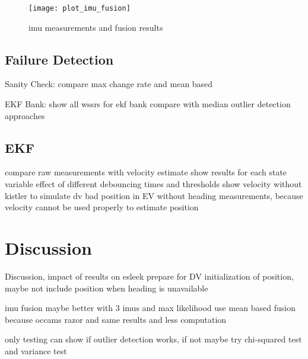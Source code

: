 \begin{figure}[t]
	\centering
	\texttt{[image: plot\_imu\_fusion]}%
	\caption{\gls{imu} measurements and fusion results}
	\label{fig:imu-fusion-real}
\end{figure}

\subsection{Failure Detection}

Sanity Check:
compare max change rate and mean based

EKF Bank:
show all wssrs for ekf bank
compare with median outlier detection approaches

\subsection{EKF}

compare raw measurements with velocity estimate
show results for each state variable
effect of different debouncing times and thresholds
show velocity without kistler to simulate dv
bad position in EV without heading measurements, because velocity cannot be used properly to estimate position






\section{Discussion}
Discussion, impact of results on esleek
prepare for DV
initialization of position, maybe not include position when heading is unavailable

imu fusion maybe better with 3 imus and max likelihood
use mean based fusion because occams razor and same results and less computation

only testing can show if outlier detection works, if not maybe try chi-squared test and variance test


